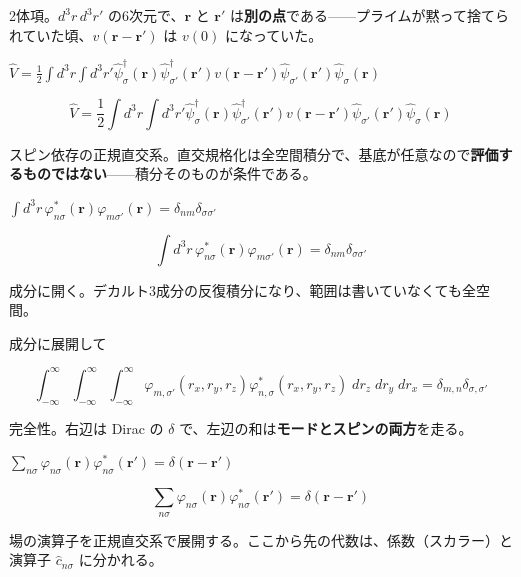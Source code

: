 \documentclass[dvipdfmx,a4paper,11pt]{jsarticle}
\begin{document}
2体項。$d^3r\,d^3r'$ の6次元で、$\mathbf r$ と $\mathbf r'$ は\textbf{別の点}である——プライムが黙って捨てられていた頃、$v(\mathbf r-\mathbf r')$ は $v(0)$ になっていた。

$\hat V = \frac{1}{2}\int d^3r \int d^3r' \hat\psi^\dagger_\sigma(\mathbf{r}) \hat\psi^\dagger_{\sigma'}(\mathbf{r}') v(\mathbf{r}-\mathbf{r}') \hat\psi_{\sigma'}(\mathbf{r}') \hat\psi_\sigma(\mathbf{r})$

\begin{equation}
  \hat V = \frac{1}{2}\int d^3r \int d^3r' \hat\psi^\dagger_\sigma(\mathbf{r}) \hat\psi^\dagger_{\sigma'}(\mathbf{r}') v(\mathbf{r}-\mathbf{r}') \hat\psi_{\sigma'}(\mathbf{r}') \hat\psi_\sigma(\mathbf{r})
  \label{eq:E5}
\end{equation}

スピン依存の正規直交系。直交規格化は全空間積分で、基底が任意なので\textbf{評価するものではない}——積分そのものが条件である。

$\int d^3r\, \varphi^{\ast}_{n\sigma}(\mathbf{r}) \varphi_{m\sigma'}(\mathbf{r}) = \delta_{nm}\delta_{\sigma\sigma'}$

\begin{equation}
  \int d^3r\, \varphi^{\ast}_{n\sigma}(\mathbf{r}) \varphi_{m\sigma'}(\mathbf{r}) = \delta_{nm}\delta_{\sigma\sigma'}
  \label{eq:E6}
\end{equation}

成分に開く。デカルト3成分の反復積分になり、範囲は書いていなくても全空間。

成分に展開して

\begin{equation}
  \int_{-\infty }^{\infty }{\int_{-\infty }^{\infty }{\int_{-\infty }^{\infty }{\varphi_{m,\sigma'}(r_{x}, r_{y}, r_{z}) \varphi^{\ast}_{n,\sigma}(r_{x}, r_{y}, r_{z})\;dr_{z}}\;dr_{y}}\;dr_{x}}=\delta_{m, n}  \delta_{\sigma, \sigma'}
  \label{eq:E7}
\end{equation}

完全性。右辺は Dirac の $\delta$ で、左辺の和は\textbf{モードとスピンの両方}を走る。

$\sum_{n\sigma} \varphi_{n\sigma}(\mathbf{r}) \varphi^{\ast}_{n\sigma}(\mathbf{r}') = \delta(\mathbf{r}-\mathbf{r}')$

\begin{equation}
  \sum_{n\sigma} \varphi_{n\sigma}(\mathbf{r}) \varphi^{\ast}_{n\sigma}(\mathbf{r}') = \delta(\mathbf{r}-\mathbf{r}')
  \label{eq:E8}
\end{equation}

場の演算子を正規直交系で展開する。ここから先の代数は、係数（スカラー）と演算子 $\hat c_{n\sigma}$ に分かれる。
\end{document}
